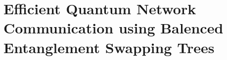 \chapter{Efficient Quantum Network Communication using Balenced Entanglement Swapping Trees}
\label{chap:swappingtrees}


              


% 

%  
% 



%     
